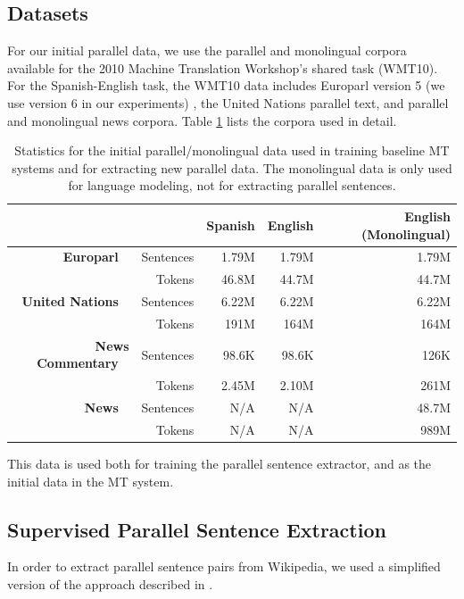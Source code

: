\subsection{Datasets}
For our initial parallel data, we use the parallel and monolingual corpora
available for the 2010 Machine Translation Workshop's shared task (WMT10). For
the Spanish-English task, the WMT10 data includes Europarl version 5 (we use
version 6 in our experiments) \citep{Koehn05}, the United Nations
parallel text, and parallel and monolingual news corpora. Table \ref{table:esen_parallel}
lists the corpora used in detail.

\begin{table}[ht]
\begin{center}
\begin{tabular}{|rr||r|r|r|}
\hline
      &                & Spanish        & English & English (Monolingual) \\
\hline
\textbf{Europarl} \
      & Sentences     & 1.79M       & 1.79M   & 1.79M   \\
      & Tokens     & 46.8M       & 44.7M   & 44.7M   \\
\hline
\textbf{United Nations} \
      & Sentences     & 6.22M       & 6.22M & 6.22M     \\
      & Tokens     & 191M       & 164M & 164M     \\
\hline
\textbf{News Commentary} \
      & Sentences     & 98.6K       & 98.6K & 126K      \\
      & Tokens     & 2.45M       & 2.10M  & 261M    \\
\hline
\textbf{News} \
      & Sentences     & N/A       & N/A & 48.7M     \\
      & Tokens     & N/A       & N/A & 989M     \\
\hline
\end{tabular}
\end{center}
\caption{Statistics for the initial parallel/monolingual data used in training
baseline MT systems and for extracting new parallel data. The monolingual data
is only used for language modeling, not for extracting parallel sentences.}
\label{table:esen_parallel}
\end{table}

This data is used both for training the parallel sentence extractor, and as the
initial data in the MT system.

\subsection{Supervised Parallel Sentence Extraction}
In order to extract parallel sentence pairs from Wikipedia, we used a simplified
version of the approach described in \citet{Smith10}.

